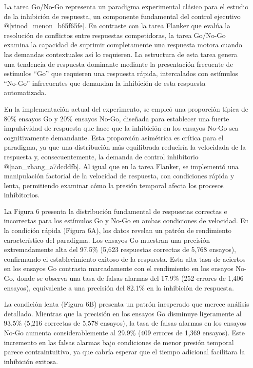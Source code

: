 \documentclass[
  spanish,
  10pt,
]{article}
\begin{document}
La tarea Go/No-Go representa un paradigma experimental clásico para el
estudio de la inhibición de respuesta, un componente fundamental del
control ejecutivo @{[}vinod\_menon\_b65f65fe{]}. En contraste con la
tarea Flanker que evalúa la resolución de conflictos entre respuestas
competidoras, la tarea Go/No-Go examina la capacidad de suprimir
completamente una respuesta motora cuando las demandas contextuales así
lo requieren. La estructura de esta tarea genera una tendencia de
respuesta dominante mediante la presentación frecuente de estímulos
``Go'' que requieren una respuesta rápida, intercalados con estímulos
``No-Go'' infrecuentes que demandan la inhibición de esta respuesta
automatizada.

En la implementación actual del experimento, se empleó una proporción
típica de 80\% ensayos Go y 20\% ensayos No-Go, diseñada para establecer
una fuerte impulsividad de respuesta que hace que la inhibición en los
ensayos No-Go sea cognitivamente demandante. Esta proporción asimétrica
es crítica para el paradigma, ya que una distribución más equilibrada
reduciría la velocidada de la respuesta y, consecuentemente, la demanda
de control inhibitorio @{[}nan\_zhang\_a7dcddfb{]}. Al igual que en la
tarea Flanker, se implementó una manipulación factorial de la velocidad
de respuesta, con condiciones rápida y lenta, permitiendo examinar cómo
la presión temporal afecta los procesos inhibitorios.

La Figura 6 presenta la distribución fundamental de respuestas correctas
e incorrectas para los estímulos Go y No-Go en ambas condiciones de
velocidad. En la condición rápida (Figura 6A), los datos revelan un
patrón de rendimiento característico del paradigma. Los ensayos Go
muestran una precisión extremadamente alta del 97.5\% (5,623 respuestas
correctas de 5,768 ensayos), confirmando el establecimiento exitoso de
la respuesta. Esta alta tasa de aciertos en los ensayos Go contrasta
marcadamente con el rendimiento en los ensayos No-Go, donde se observa
una tasa de falsas alarmas del 17.9\% (252 errores de 1,406 ensayos),
equivalente a una precisión del 82.1\% en la inhibición de respuesta.

La condición lenta (Figura 6B) presenta un patrón inesperado que merece
análisis detallado. Mientras que la precisión en los ensayos Go
disminuye ligeramente al 93.5\% (5,216 correctas de 5,578 ensayos), la
tasa de falsas alarmas en los ensayos No-Go aumenta considerablemente al
29.9\% (409 errores de 1,369 ensayos). Este incremento en las falsas
alarmas bajo condiciones de menor presión temporal parece
contraintuitivo, ya que cabría esperar que el tiempo adicional
facilitara la inhibición exitosa.
\end{document}
